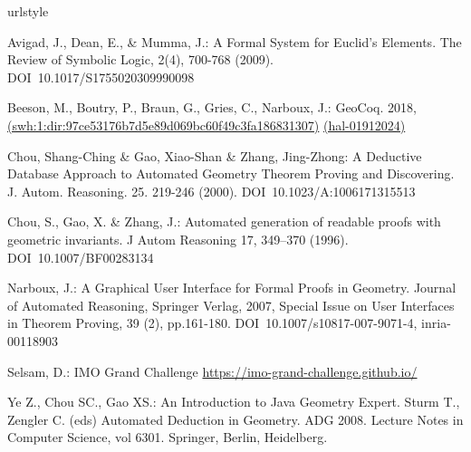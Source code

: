 \documentclass[runningheads]{llncs}
\begin{document}
\begin{thebibliography}
\expandafter\ifx\csname urlstyle\endcsname\relax
  \providecommand{\doi}[1]{DOI~\discretionary{}{}{}#1}\else
  \providecommand{\doi}{DOI~\discretionary{}{}{}\begingroup
  \urlstyle{rm}\Url}\fi

  Avigad, J., Dean, E., \& Mumma, J.: A Formal System for Euclid's Elements.
  \newblock The Review of Symbolic Logic, 2(4), 700-768 (2009).
  \newblock \doi{10.1017/S1755020309990098}

  Beeson, M., Boutry, P., Braun, G., Gries, C., Narboux, J.: GeoCoq. 2018,
  \newblock \href{https://archive.softwareheritage.org/browse/swh:1:dir:97ce53176b7d5e89d069bc60f49c3fa186831307}{(swh:1:dir:97ce53176b7d5e89d069bc60f49c3fa186831307)}
  \newblock \href{https://hal.inria.fr/hal-01912024}{(hal-01912024)}

  Chou, Shang-Ching \& Gao, Xiao-Shan \& Zhang, Jing-Zhong:
  A Deductive Database Approach to Automated Geometry Theorem Proving
  and Discovering.
  \newblock J. Autom. Reasoning. 25. 219-246 (2000).
  \newblock \doi{10.1023/A:1006171315513}

  Chou, S., Gao, X. \& Zhang, J.: Automated generation of readable proofs
  with geometric invariants.
  \newblock J Autom Reasoning 17, 349–370 (1996).
  \newblock \doi{10.1007/BF00283134}

  Narboux, J.: A Graphical User Interface for Formal Proofs in
  Geometry.
  \newblock Journal of Automated Reasoning, Springer Verlag, 2007,
  \newblock Special Issue on User Interfaces in Theorem Proving, 39
  (2), pp.161-180.
  \newblock \doi{10.1007/s10817-007-9071-4}, inria-00118903

  Selsam, D.: IMO Grand Challenge
  \newblock \url{https://imo-grand-challenge.github.io/}

  Ye Z., Chou SC., Gao XS.: An Introduction to Java Geometry Expert.
  \newblock Sturm T., Zengler C. (eds) Automated Deduction in
  Geometry. ADG 2008.
  \newblock Lecture Notes in Computer Science, vol 6301. Springer, Berlin, Heidelberg.
  

  \end{thebibliography}
\end{document}

